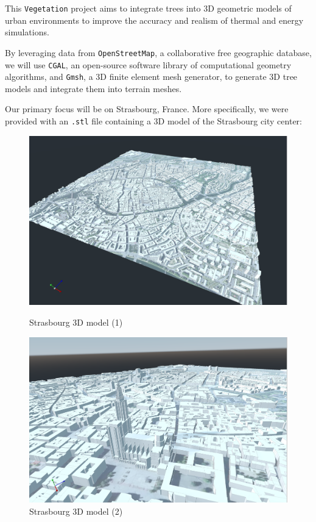 \documentclass[12pt]{article}
\begin{document}
This \texttt{Vegetation} project aims to integrate trees into 3D geometric 
models of urban environments to improve the accuracy and realism of thermal 
and energy simulations.

By leveraging data from \texttt{OpenStreetMap}\cite{openstreetmap}, a 
collaborative free geographic database, we will use \texttt{CGAL}\cite{cgal}, 
an open-source software library of computational geometry algorithms, and 
\texttt{Gmsh}\cite{gmsh}, a 3D finite element mesh generator, to generate 3D 
tree models and integrate them into terrain meshes.

Our primary focus will be on Strasbourg, France. More specifically, we were 
provided with an \texttt{.stl}\cite{stl} file containing a 3D model of the 
Strasbourg city center:

\begin{figure}[H]
    \centering
    \begin{minipage}{0.45\textwidth}
      \centering
      \includegraphics[width=1\textwidth]{images/strasbourg-mesh-1.png}
      \caption{Strasbourg 3D model (1)}
    \end{minipage}
    \begin{minipage}{0.45\textwidth}
      \centering
      \includegraphics[width=1\textwidth]{images/strasbourg-mesh-2.png}
      \caption{Strasbourg 3D model (2)}
    \end{minipage}
\end{figure}
\end{document}
